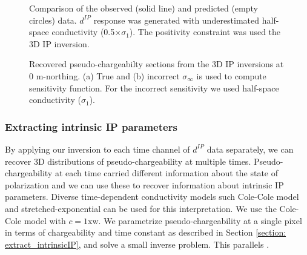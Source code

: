 \documentclass[extra,mreferee]{gji}
\newcommand{\siginf}{\sigma_\infty}
\newcommand{\dip}{d^{IP}}
\begin{document}
\begin{figure}
  \caption{Comparison of the observed (solid line) and predicted (empty circles) data. $\dip$ response was generated with underestimated half-space conductivity (0.5$\times \sigma_1$). The positivity constraint was used the 3D IP inversion.}
  \label{F:Reg_obspred}
\end{figure}

\begin{figure}
  \caption{Recovered pseudo-chargeabilty sections from the 3D IP inversions at 0 m-northing.  (a) True and (b) incorrect $\siginf$ is used to compute sensitivity function. For the incorrect sensitivity we used half-space conductivity ($\sigma_1$).}
  \label{F:True_vs_approx_sensitivity}
\end{figure}
\clearpage

\subsubsection{Extracting intrinsic IP parameters}
By applying our inversion to each time channel of $\dip$ data separately, we can recover 3D distributions of pseudo-chargeability at multiple times. 
Pseudo-chargeability at each time carried different information about the state of polarization and we can use these to recover information about intrinsic IP parameters. 
Diverse time-dependent conductivity models such Cole-Cole model and stretched-exponential can be used for this interpretation.
We use the Cole-Cole model with $c=1$xw. 
We parametrize pseudo-chargeability at a single pixel in terms of chargeability and time constant as described in Section \ref{section: extract_intrinsicIP}, and solve a small inverse problem. This parallels \cite[]{Yuval1997,Hordt2006}.
\end{document}
